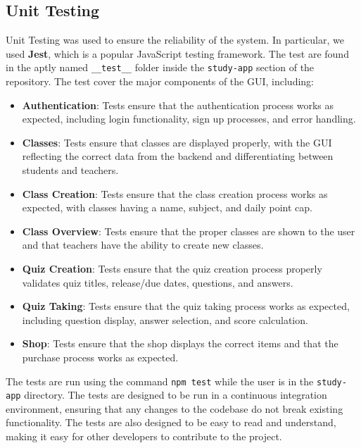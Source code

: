 \subsection{Unit Testing}
Unit Testing was used to ensure the reliability of the system. In particular, we used \textbf{Jest}, which is a popular JavaScript testing framework. The test are found in the aptly named \texttt{\_\_test\_\_} folder inside the \texttt{study-app} section of the repository. The test cover the major components of the GUI, including:
\begin{itemize}
    \item \textbf{Authentication}: Tests ensure that the authentication process works as expected, including login functionality, sign up processes, and error handling.
    \item \textbf{Classes}: Tests ensure that classes are displayed properly, with the GUI reflecting the correct data from the backend and differentiating between students and teachers.
    \item \textbf{Class Creation}: Tests ensure that the class creation process works as expected, with classes having a name, subject, and daily point cap.
    \item \textbf{Class Overview}: Tests ensure that the proper classes are shown to the user and that teachers have the ability to create new classes.
    \item \textbf{Quiz Creation}: Tests ensure that the quiz creation process properly validates quiz titles, release/due dates, questions, and answers.
    \item \textbf{Quiz Taking}: Tests ensure that the quiz taking process works as expected, including question display, answer selection, and score calculation.
    \item \textbf{Shop}: Tests ensure that the shop displays the correct items and that the purchase process works as expected.
\end{itemize}

The tests are run using the command \texttt{npm test} while the user is in the \texttt{study-app} directory. The tests are designed to be run in a continuous integration environment, ensuring that any changes to the codebase do not break existing functionality. The tests are also designed to be easy to read and understand, making it easy for other developers to contribute to the project.